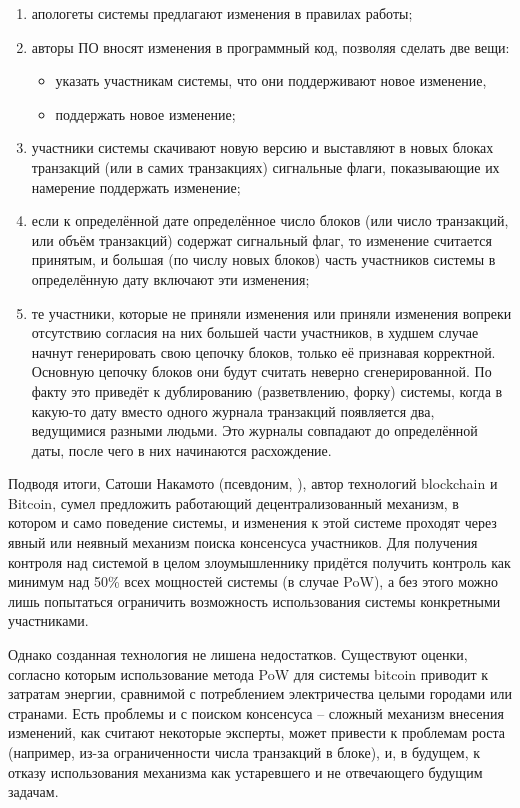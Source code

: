 \begin{enumerate}
	\item апологеты системы предлагают изменения в правилах работы;
	\item авторы ПО вносят изменения в программный код, позволяя сделать две вещи:
	\begin{itemize}
		\item указать участникам системы, что они поддерживают новое изменение,
		\item поддержать новое изменение;
	\end{itemize}
	\item участники системы скачивают новую версию и выставляют в новых блоках транзакций (или в самих транзакциях) сигнальные флаги, показывающие их намерение поддержать изменение;
	\item если к определённой дате определённое число блоков (или число транзакций, или объём транзакций) содержат сигнальный флаг, то изменение считается принятым, и большая (по числу новых блоков) часть участников системы в определённую дату включают эти изменения;
	\item те участники, которые не приняли изменения или приняли изменения вопреки отсутствию согласия на них большей части участников, в худшем случае начнут генерировать свою цепочку блоков, только её признавая корректной. Основную цепочку блоков они будут считать неверно сгенерированной. По факту это приведёт к дублированию (разветвлению, форку) системы, когда в какую-то дату вместо одного журнала транзакций появляется два, ведущимися разными людьми. Это журналы совпадают до определённой даты, после чего в них начинаются расхождение.
\end{enumerate}

Подводя итоги, Сатоши Накамото (псевдоним, ), автор технологий blockchain и Bitcoin, сумел предложить работающий децентрализованный механизм, в котором и само поведение системы, и изменения к этой системе проходят через явный или неявный механизм поиска консенсуса участников. Для получения контроля над системой в целом злоумышленнику придётся получить контроль как минимум над 50\% всех мощностей системы (в случае PoW), а без этого можно лишь попытаться ограничить возможность использования системы конкретными участниками.

Однако созданная технология не лишена недостатков. Существуют оценки, согласно которым использование метода PoW для системы bitcoin приводит к затратам энергии, сравнимой с потреблением электричества целыми городами или странами. Есть проблемы и с поиском консенсуса -- сложный механизм внесения изменений, как считают некоторые эксперты, может привести к проблемам роста (например, из-за ограниченности числа транзакций в блоке), и, в будущем, к отказу использования механизма как устаревшего и не отвечающего будущим задачам.

